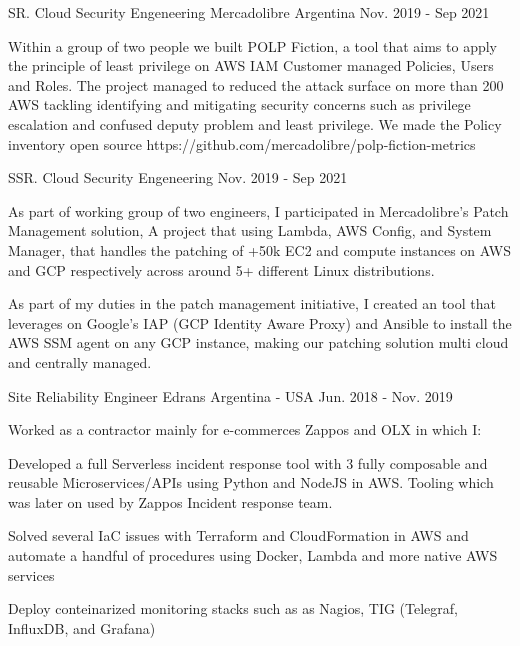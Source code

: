 \begin{cventries}
\cventry
{SR. Cloud Security Engeneering} %
{Mercadolibre} %
{Argentina} %
{Nov. 2019 - Sep 2021} %
{
\begin{cvitems} %
\item {Within a group of two people we built POLP Fiction, a tool that aims to apply the principle of least privilege on AWS IAM Customer managed Policies, Users and Roles. The project managed to reduced the attack surface on more than 200 AWS tackling identifying and mitigating security concerns such as privilege escalation and confused deputy problem and least privilege. We made the Policy inventory open source https://github.com/mercadolibre/polp-fiction-metrics}
\end{cvitems} 
}
\cventry
{SSR. Cloud Security Engeneering} %
{} %
{} %
{Nov. 2019 - Sep 2021} %
{
\begin{cvitems} %
\item {As part of working group of two engineers, I participated in Mercadolibre's Patch Management solution, A project that using Lambda, AWS Config, and System Manager, that handles the patching of +50k EC2 and compute instances on AWS and GCP respectively across around 5+ different Linux distributions.}
\item {As part of my duties in the patch management initiative, I created an tool that leverages on Google's IAP (GCP Identity Aware Proxy) and Ansible to install the AWS SSM agent on any GCP instance, making our patching solution multi cloud and centrally managed.}
\end{cvitems} 
}

\cventry
{Site Reliability Engineer} %
{Edrans} %
{Argentina - USA} %
{Jun. 2018 - Nov. 2019} %
{
\begin{cvitems} %
\item {Worked as a contractor mainly for e-commerces Zappos and OLX in which I:}
\item {Developed a full Serverless incident response tool with 3 fully composable and reusable Microservices/APIs using Python and NodeJS in AWS. Tooling which was later on used by Zappos Incident response team.}
\item {Solved several IaC issues with Terraform and CloudFormation in AWS and automate a handful of procedures using Docker, Lambda and more native AWS services}
\item {Deploy conteinarized monitoring stacks such as as Nagios, TIG (Telegraf, InfluxDB, and Grafana)}
\end{cvitems}
}


\end{cventries}
